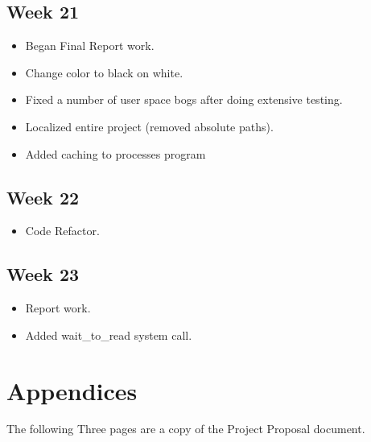 \documentclass[a4paper]{report}
\begin{document}
\section{Week 21}
\begin{itemize}
\item Began Final Report work.
\item Change color to black on white.
\item Fixed a number of user space bogs after doing extensive testing.
\item Localized entire project (removed absolute paths).
\item Added caching to processes program
\end{itemize}

\section{Week 22}
\begin{itemize}
\item Code Refactor.
\end{itemize}

\section{Week 23}
\begin{itemize}
\item Report work.
\item Added wait\_to\_read system call.
\end{itemize}

\chapter{Appendices}

The following Three pages are a copy of the Project Proposal document.








\end{document}

